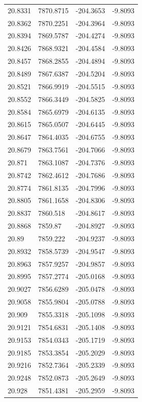 \begin{table}[H]
\begin{tabular}{llll}
20.8331 & 7870.8715 & -204.3653 & -9.8093 \\
20.8362 & 7870.2251 & -204.3964 & -9.8093 \\
20.8394 & 7869.5787 & -204.4274 & -9.8093 \\
20.8426 & 7868.9321 & -204.4584 & -9.8093 \\
20.8457 & 7868.2855 & -204.4894 & -9.8093 \\
20.8489 & 7867.6387 & -204.5204 & -9.8093 \\
20.8521 & 7866.9919 & -204.5515 & -9.8093 \\
20.8552 & 7866.3449 & -204.5825 & -9.8093 \\
20.8584 & 7865.6979 & -204.6135 & -9.8093 \\
20.8615 & 7865.0507 & -204.6445 & -9.8093 \\
20.8647 & 7864.4035 & -204.6755 & -9.8093 \\
20.8679 & 7863.7561 & -204.7066 & -9.8093 \\
20.871 & 7863.1087 & -204.7376 & -9.8093 \\
20.8742 & 7862.4612 & -204.7686 & -9.8093 \\
20.8774 & 7861.8135 & -204.7996 & -9.8093 \\
20.8805 & 7861.1658 & -204.8306 & -9.8093 \\
20.8837 & 7860.518 & -204.8617 & -9.8093 \\
20.8868 & 7859.87 & -204.8927 & -9.8093 \\
20.89 & 7859.222 & -204.9237 & -9.8093 \\
20.8932 & 7858.5739 & -204.9547 & -9.8093 \\
20.8963 & 7857.9257 & -204.9857 & -9.8093 \\
20.8995 & 7857.2774 & -205.0168 & -9.8093 \\
20.9027 & 7856.6289 & -205.0478 & -9.8093 \\
20.9058 & 7855.9804 & -205.0788 & -9.8093 \\
20.909 & 7855.3318 & -205.1098 & -9.8093 \\
20.9121 & 7854.6831 & -205.1408 & -9.8093 \\
20.9153 & 7854.0343 & -205.1719 & -9.8093 \\
20.9185 & 7853.3854 & -205.2029 & -9.8093 \\
20.9216 & 7852.7364 & -205.2339 & -9.8093 \\
20.9248 & 7852.0873 & -205.2649 & -9.8093 \\
20.928 & 7851.4381 & -205.2959 & -9.8093 \\

\end{tabular}
\end{table}
